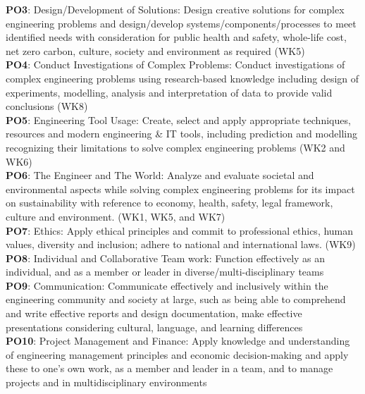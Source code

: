 \begin{titlepage}
\textbf{PO3}: Design/Development of Solutions: Design creative solutions for complex engineering problems and design/develop systems/components/processes to meet identified needs with consideration for public health and safety, whole-life cost, net zero carbon, culture, society and environment as required (WK5)\\

\textbf{PO4}: Conduct Investigations of Complex Problems: Conduct investigations of complex engineering problems using research-based knowledge including design of experiments, modelling, analysis and interpretation of data to provide valid conclusions (WK8)\\

\textbf{PO5}: Engineering Tool Usage: Create, select and apply appropriate techniques, resources and modern engineering \& IT tools, including prediction and modelling recognizing their limitations to solve complex engineering problems (WK2 and WK6)\\

\textbf{PO6}: The Engineer and The World: Analyze and evaluate societal and environmental aspects while solving complex engineering problems for its impact on sustainability with reference to economy, health, safety, legal framework, culture and environment. (WK1, WK5, and WK7)\\

\textbf{PO7}: Ethics: Apply ethical principles and commit to professional ethics, human values, diversity and inclusion; adhere to national and international laws. (WK9)\\

\textbf{PO8}: Individual and Collaborative Team work: Function effectively as an individual, and as a member or leader in diverse/multi-disciplinary teams\\

\textbf{PO9}: Communication: Communicate effectively and inclusively within the engineering community and society at large, such as being able to comprehend and write effective reports and design documentation, make effective presentations considering cultural, language, and learning differences\\

\textbf{PO10}: Project Management and Finance: Apply knowledge and understanding of engineering management principles and economic decision-making and apply these to one’s own work, as a member and leader in a team, and to manage projects and in multidisciplinary environments\\


\end{titlepage}
